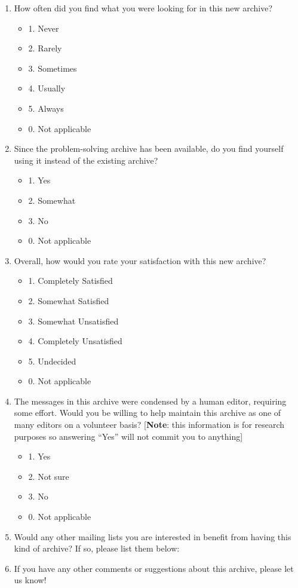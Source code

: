 \begin{enumerate}
\item How often did you find what you were looking for in this new archive?
  \begin{itemize}
  \item 1. Never
  \item 2. Rarely
  \item 3. Sometimes
  \item 4. Usually
  \item 5. Always
  \item 0. Not applicable
  \end{itemize}
\item Since the problem-solving archive has been available, do you find
  yourself using it instead of the existing archive?
  \begin{itemize}
  \item 1. Yes
  \item 2. Somewhat
  \item 3. No
  \item 0. Not applicable
  \end{itemize}
\item Overall, how would you rate your satisfaction with this new archive?
  \begin{itemize}
  \item 1. Completely Satisfied
  \item 2. Somewhat Satisfied
  \item 3. Somewhat Unsatisfied
  \item 4. Completely Unsatisfied
  \item 5. Undecided
  \item 0. Not applicable
  \end{itemize}
\item The messages in this archive were condensed by a human editor, requiring
  some effort. Would you be willing to help maintain this archive as one of
  many editors on a volunteer basis? [{\bf Note}: this information is for
  research purposes so answering ``Yes'' will not commit you to anything]
  \begin{itemize}
  \item 1. Yes
  \item 2. Not sure
  \item 3. No
  \item 0. Not applicable
  \end{itemize}
\item Would any other mailing lists you are interested in benefit from having
  this kind of archive? If so, please list them below:
\item If you have any other comments or suggestions about this archive, please
  let us know!
\end{enumerate}


